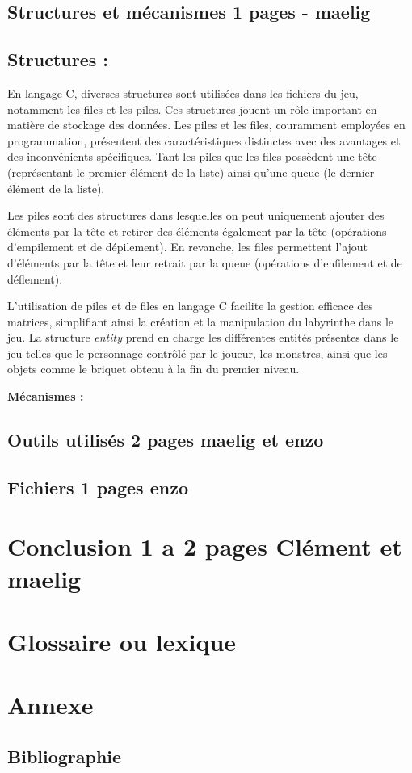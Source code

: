 \documentclass[10pt]{article}
\begin{document}
   \subsection{Structures et mécanismes 1 pages - maelig}
   \subsection{Structures :}

   En langage C, diverses structures sont utilisées dans les fichiers du jeu, notamment les files et les piles. 
   Ces structures jouent un rôle important en matière de stockage des données. Les piles et les files, couramment employées en programmation, 
   présentent des caractéristiques distinctes avec des avantages et des inconvénients spécifiques. Tant les piles que les files possèdent une tête 
   (représentant le premier élément de la liste) ainsi qu'une queue (le dernier élément de la liste).

   Les piles sont des structures dans lesquelles on peut uniquement ajouter des éléments par la tête et retirer des éléments également par la tête 
   (opérations d'empilement et de dépilement). En revanche, les files permettent l'ajout d'éléments par la tête et leur retrait par la queue 
   (opérations d'enfilement et de déflement).

   L'utilisation de piles et de files en langage C facilite la gestion efficace des matrices, simplifiant ainsi la création et la manipulation du 
   labyrinthe dans le jeu. La structure \textit{entity} prend en charge les différentes entités présentes dans le jeu telles que le personnage contrôlé 
   par le joueur, les monstres, ainsi que les objets comme le briquet obtenu à la fin du premier niveau.


   \textbf{Mécanismes :}\\
   \subsection{Outils utilisés 2 pages maelig et enzo}
   \subsection{Fichiers 1 pages enzo}
   
\section{Conclusion 1 a 2 pages Clément et maelig}

\section{Glossaire ou lexique}

\section{Annexe}
   \subsection{Bibliographie}
\end{document}
